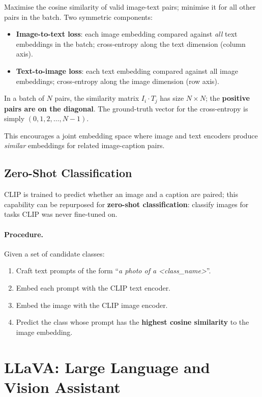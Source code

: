 \documentclass[11pt,a4paper]{article}
\theoremstyle{definition}
\theoremstyle{plain}
\theoremstyle{remark}
\begin{document}
Maximise the cosine similarity of valid image-text pairs; minimise it for all other pairs in the batch. Two symmetric components:
\begin{itemize}
    \item \textbf{Image-to-text loss}: each image embedding compared against \emph{all} text embeddings in the batch; cross-entropy along the text dimension (column axis).
    \item \textbf{Text-to-image loss}: each text embedding compared against all image embeddings; cross-entropy along the image dimension (row axis).
\end{itemize}

In a batch of $N$ pairs, the similarity matrix $I_i \cdot T_j$ has size $N \times N$; the \textbf{positive pairs are on the diagonal}. The ground-truth vector for the cross-entropy is simply $(0, 1, 2, \ldots, N-1)$.

This encourages a joint embedding space where image and text encoders produce \emph{similar} embeddings for related image-caption pairs.

\subsection{Zero-Shot Classification}

CLIP is trained to predict whether an image and a caption are paired; this capability can be repurposed for \textbf{zero-shot classification}: classify images for tasks CLIP was never fine-tuned on.

\paragraph{Procedure.} Given a set of candidate classes:
\begin{enumerate}
    \item Craft text prompts of the form ``\emph{a photo of a <class\_name>}''.
    \item Embed each prompt with the CLIP text encoder.
    \item Embed the image with the CLIP image encoder.
    \item Predict the class whose prompt has the \textbf{highest cosine similarity} to the image embedding.
\end{enumerate}


\section{LLaVA: Large Language and Vision Assistant}
\end{document}
